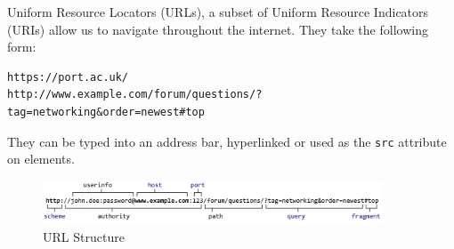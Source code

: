 
Uniform Resource Locators (URLs), a subset of Uniform Resource Indicators (URIs) allow us to navigate throughout the internet. They take the following form:
\begin{verbatim}
https://port.ac.uk/
http://www.example.com/forum/questions/?tag=networking&order=newest#top
\end{verbatim}
They can be typed into an address bar, hyperlinked or used as the \verb|src| attribute on elements.
\begin{figure}[H]
    \centering
    \includegraphics[width=0.9\textwidth]{assets/url-structure.png}
    \caption{URL Structure}
\end{figure}
